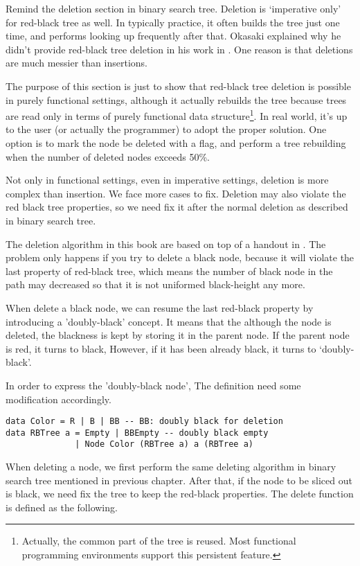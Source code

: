 \documentclass{article}
\begin{document}
Remind the deletion section in binary search tree. Deletion is
`imperative only' for red-black tree as well. In typically
practice, it often builds the tree just one time, and
performs looking up frequently after that. Okasaki explained
why he didn't provide red-black tree deletion in his work
in \cite{okasaki-blog}. One reason is that deletions are
much messier than insertions.

The purpose of this section is just to show that red-black
tree deletion is possible in purely functional settings,
although it actually rebuilds the tree because trees are
read only in terms of purely functional data structure\footnote{Actually, the common part of the tree is reused. Most functional programming environments support this persistent feature.}.
In real world, it's up to the user (or actually the
programmer) to adopt the proper solution. One option is to mark
the node be deleted with a flag, and perform a tree rebuilding
when the number of deleted nodes exceeds 50\%.

Not only in functional settings, even in imperative settings,
deletion is more complex than insertion. We face more cases
to fix. Deletion may also violate the red black tree properties,
so we need fix it after the normal deletion as described
in binary search tree.

The deletion algorithm in this book are based on top of a
handout in \cite{lyn}. The problem only happens if you try to
delete a black node, because it will violate the last property
of red-black tree, which means the number of black
node in the path may decreased so that it is not uniformed
black-height any more.

When delete a black node, we can resume the last red-black property
by introducing a 'doubly-black' concept\cite{CLRS}. It means
that the although the node is deleted, the blackness is kept
by storing it in the parent node. If the parent node is red,
it turns to black, However, if it has been already black, it
turns to `doubly-black'.

In order to express the 'doubly-black node', The definition
need some modification accordingly.

\lstset{language=Haskell}
\begin{lstlisting}
data Color = R | B | BB -- BB: doubly black for deletion
data RBTree a = Empty | BBEmpty -- doubly black empty
              | Node Color (RBTree a) a (RBTree a)
\end{lstlisting}

When deleting a node, we first perform the same deleting
algorithm in binary search tree mentioned in previous chapter.
After that, if the node to be sliced out is black, we
need fix the tree to keep the red-black properties. The
delete function is defined as the following.
\end{document}
